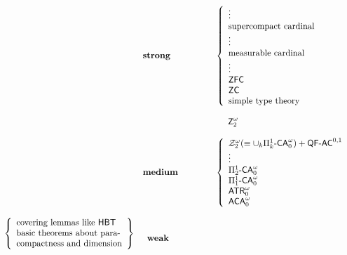 \documentclass[reqno]{amsart}
\def\FIVE{\Pi_{1}^{1}\text{-\textup{\textsf{CA}}}_{0}}
\def\SIXK{\Pi_{k}^{1}\text{-\textsf{\textup{CA}}}_{0}^{\omega}}
\def\ATR{\textup{\textsf{ATR}}}
\def\Z{\textup{\textsf{Z}}}
\def\ZFC{\textup{\textsf{ZFC}}}
\def\RCA{\textup{\textsf{RCA}}}
\def\ACA{\textup{\textsf{ACA}}}
\def\QFAC{\textup{\textsf{QF-AC}}}
\def\HBT{\textup{\textsf{HBT}}}
\numberwithin{equation}{section}
\numberwithin{thm}{section}
\begin{document}
\begin{figure}[h]
\[
\begin{array}{lll}
&\textup{\textbf{strong}} \hspace{1.5cm}& 
\left\{\begin{array}{l}
\vdots\\
\textup{supercompact cardinal}\\
\vdots\\
\textup{measurable cardinal}\\
\vdots\\
\ZFC \\
\textsf{\textup{ZC}} \\
\textup{simple type theory}
\end{array}\right.
\\
&& \\
  &&~\quad{ {\Z_{2}^{\omega}}} \\%
&&\\
&\textup{\textbf{medium}} & 
\left\{\begin{array}{l}
 \mathcal{Z}_{2}^{\omega}( \equiv \cup_{k}\SIXK)+ \QFAC^{0,1}\\
\vdots\\
\textup{$\Pi_{2}^{1}\textsf{-CA}_{0}^{ {\omega}}$}\\
\textup{$\FIVE^{ {\omega}}$ }\\
\textup{$\ATR_{0}^{ {\omega}}$}  \\
\textup{$\ACA_{0}^{ {\omega}}$} \\
\end{array}\right.
\\
&
\\
{ {\left\{\begin{array}{l}
\textup{covering lemmas like $\HBT$}\\
\textup{basic theorems about para-}\\
\textup{compactness and dimension}
\end{array}\right\}}}
&\begin{array}{c}\\\textup{\textbf{weak}}\\ \end{array}& 

\end{array}\]
\end{figure}
\end{document}
